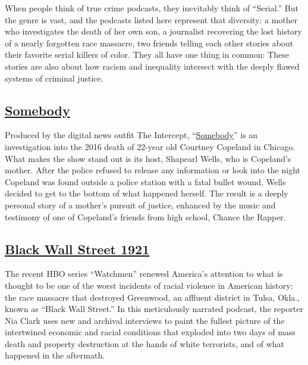When people think of true crime podcasts, they inevitably think of
``Serial.'' But the genre is vast, and the podcasts listed here
represent that diversity: a mother who investigates the death of her own
son, a journalist recovering the lost history of a nearly forgotten race
massacre, two friends telling each other stories about their favorite
serial killers of color. They all have one thing in common: These
stories are also about how racism and inequality intersect with the
deeply flawed systems of criminal justice.

\hypertarget{somebody}{%
\subsection{\texorpdfstring{\href{https://theintercept.com/podcasts/somebody/}{Somebody}}{Somebody}}\label{somebody}}

Produced by the digital news outfit The Intercept,
``\href{https://theintercept.com/podcasts/somebody/}{Somebody}'' is an
investigation into the 2016 death of 22-year old Courtney Copeland in
Chicago. What makes the show stand out is its host, Shapearl Wells, who
is Copeland's mother. After the police refused to release any
information or look into the night Copeland was found outside a police
station with a fatal bullet wound, Wells decided to get to the bottom of
what happened herself. The result is a deeply personal story of a
mother's pursuit of justice, enhanced by the music and testimony of one
of Copeland's friends from high school, Chance the Rapper.

\hypertarget{black-wall-street-1921}{%
\subsection{\texorpdfstring{\href{https://www.blackwallstreet-1921.com/}{Black
Wall Street
1921}}{Black Wall Street 1921}}\label{black-wall-street-1921}}

The recent HBO series ``Watchmen'' renewed America's attention to what
is thought to be one of the worst incidents of racial violence in
American history: the race massacre that destroyed Greenwood, an
affluent district in Tulsa, Okla., known as ``Black Wall Street.'' In
this meticulously narrated podcast, the reporter Nia Clark uses new and
archival interviews to paint the fullest picture of the intertwined
economic and racial conditions that exploded into two days of mass death
and property destruction at the hands of white terrorists, and of what
happened in the aftermath.

